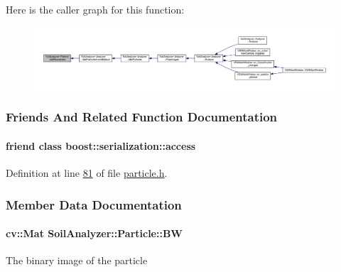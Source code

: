 Here is the caller graph for this function\+:
\nopagebreak
\begin{figure}[H]
\begin{center}
\leavevmode
\includegraphics[width=350pt]{class_soil_analyzer_1_1_particle_a52c104046f8cc25940ae26a84c91a62c_icgraph}
\end{center}
\end{figure}




\subsubsection{Friends And Related Function Documentation}
\hypertarget{class_soil_analyzer_1_1_particle_ac98d07dd8f7b70e16ccb9a01abf56b9c}{}
\paragraph[{boost\+::serialization\+::access}]{\setlength{\rightskip}{0pt plus 5cm}friend class boost\+::serialization\+::access\hspace{0.3cm}{\ttfamily [friend]}}\label{class_soil_analyzer_1_1_particle_ac98d07dd8f7b70e16ccb9a01abf56b9c}


Definition at line \hyperlink{particle_8h_source_l00081}{81} of file \hyperlink{particle_8h_source}{particle.\+h}.



\subsubsection{Member Data Documentation}
\hypertarget{class_soil_analyzer_1_1_particle_a885a9f3ca828244a72c5866fff7d2e89}{}
\paragraph[{B\+W}]{\setlength{\rightskip}{0pt plus 5cm}cv\+::\+Mat Soil\+Analyzer\+::\+Particle\+::\+B\+W}\label{class_soil_analyzer_1_1_particle_a885a9f3ca828244a72c5866fff7d2e89}
The binary image of the particle 

